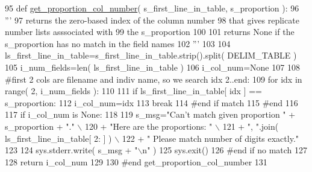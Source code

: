 \begin{DoxyCode}
95 \textcolor{keyword}{def }\hyperlink{namespacenegui_1_1indiv_ae7fb810142ce304fc6d7c59e8062d1a5}{get\_proportion\_col\_number}( s\_first\_line\_in\_table, s\_proportion ):
96     \textcolor{stringliteral}{'''}
97 \textcolor{stringliteral}{    returns the zero-based index of the column number}
98 \textcolor{stringliteral}{    that gives replicate number lists asssociated with}
99 \textcolor{stringliteral}{    the s\_proportion}
100 \textcolor{stringliteral}{}
101 \textcolor{stringliteral}{    returns None if the s\_proportion has no match in the field names}
102 \textcolor{stringliteral}{    '''}
103 
104     ls\_first\_line\_in\_table=s\_first\_line\_in\_table.strip().split( DELIM\_TABLE )
105     i\_num\_fields=len( ls\_first\_line\_in\_table )
106     i\_col\_num=\textcolor{keywordtype}{None}
107 
108     \textcolor{comment}{#first 2 cols are filename and indiv name, so we search idx 2..end:}
109     \textcolor{keywordflow}{for} idx \textcolor{keywordflow}{in} range( 2, i\_num\_fields ):
110 
111         \textcolor{keywordflow}{if} ls\_first\_line\_in\_table[ idx ] == s\_proportion:
112             i\_col\_num=idx
113             \textcolor{keywordflow}{break}
114         \textcolor{comment}{#end if match}
115     \textcolor{comment}{#end}
116 
117     \textcolor{keywordflow}{if} i\_col\_num \textcolor{keywordflow}{is} \textcolor{keywordtype}{None}:
118 
119         s\_msg=\textcolor{stringliteral}{"Can't match given proportion "} + s\_proportion + \textcolor{stringliteral}{"."} \(\backslash\)
120                 + \textcolor{stringliteral}{"Here are the proportions: "} \(\backslash\)
121                 + \textcolor{stringliteral}{", "}.join( ls\_first\_line\_in\_table[ 2: ] ) \(\backslash\)
122                 + \textcolor{stringliteral}{"  Please match number of digits exactly."}
123             
124         sys.stderr.write( s\_msg + \textcolor{stringliteral}{"\(\backslash\)n"} )
125         sys.exit()
126     \textcolor{comment}{#end if no match}
127 
128     \textcolor{keywordflow}{return} i\_col\_num 
129 
130 \textcolor{comment}{#end get\_proportion\_col\_number}
131 
\end{DoxyCode}
